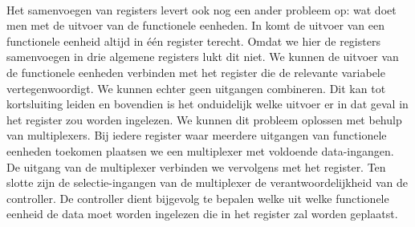 \paragraph{}
Het samenvoegen van registers levert ook nog een ander probleem op: wat doet men met de uitvoer van de functionele eenheden. In  komt de uitvoer van een functionele eenheid altijd in \'e\'en register terecht. Omdat we hier de registers samenvoegen in drie algemene registers lukt dit niet. We kunnen de uitvoer van de functionele eenheden verbinden met het register die de relevante variabele vertegenwoordigt. We kunnen echter geen uitgangen combineren. Dit kan tot kortsluiting leiden en bovendien is het onduidelijk welke uitvoer er in dat geval in het register zou worden ingelezen. We kunnen dit probleem oplossen met behulp van multiplexers. Bij iedere register waar meerdere uitgangen van functionele eenheden toekomen plaatsen we een multiplexer met voldoende data-ingangen. De uitgang van de multiplexer verbinden we vervolgens met het register. Ten slotte zijn de selectie-ingangen van de multiplexer de verantwoordelijkheid van de controller. De controller dient bijgevolg te bepalen welke uit welke functionele eenheid de data moet worden ingelezen die in het register zal worden geplaatst.
